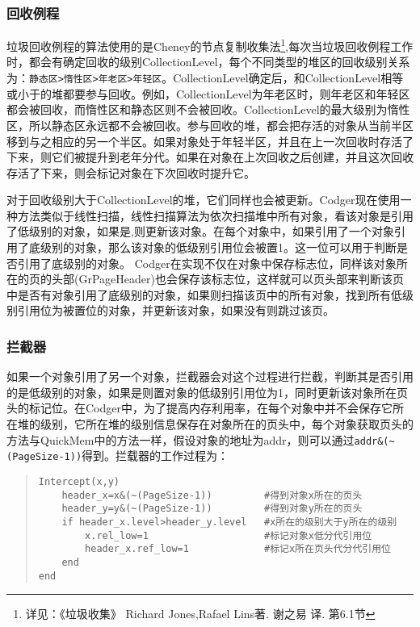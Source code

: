 \subsubsection{回收例程}
垃圾回收例程的算法使用的是Cheney的节点复制收集法\footnote{详见：《垃圾收集》 Richard Jones,Rafael Lins著. 谢之易 译. 第6.1节},每次当垃圾回收例程工作时，都会有确定回收的级别CollectionLevel，每个不同类型的堆区的回收级别关系为：\verb|静态区>惰性区>年老区>年轻区|。CollectionLevel确定后，和CollectionLevel相等或小于的堆都要参与回收。例如，CollectionLevel为年老区时，则年老区和年轻区都会被回收，而惰性区和静态区则不会被回收。CollectionLevel的最大级别为惰性区，所以静态区永远都不会被回收。参与回收的堆，都会把存活的对象从当前半区移到与之相应的另一个半区。如果对象处于年轻半区，并且在上一次回收时存活了下来，则它们被提升到老年分代。如果在对象在上次回收之后创建，并且这次回收存活了下来，则会标记对象在下次回收时提升它。

对于回收级别大于CollectionLevel的堆，它们同样也会被更新。Codger现在使用一种方法类似于线性扫描，线性扫描算法为依次扫描堆中所有对象，看该对象是引用了低级别的对象，如果是,则更新该对象。在每个对象中，如果引用了一个对象引用了底级别的对象，那么该对象的低级别引用位会被置1。这一位可以用于判断是否引用了底级别的对象。
Codger在实现不仅在对象中保存标志位，同样该对象所在的页的头部(GrPageHeader)也会保存该标志位，这样就可以页头部来判断该页中是否有对象引用了底级别的对象，如果则扫描该页中的所有对象，找到所有低级别引用位为被置位的对象，并更新该对象，如果没有则跳过该页。

\subsubsection{拦截器}
如果一个对象引用了另一个对象，拦截器会对这个过程进行拦截，判断其是否引用的是低级别的对象，如果是则置对象的低级别引用位为1，同时更新该对象所在页头的标记位。在Codger中，为了提高内存利用率，在每个对象中并不会保存它所在堆的级别，它所在堆的级别信息保存在对象所在的页头中，每个对象获取页头的方法与QuickMem中的方法一样，假设对象的地址为addr，则可以通过\verb|addr&(~(PageSize-1))|得到。拦载器的工作过程为：
\begin{quote}
\begin{verbatim}
Intercept(x,y)
    header_x=x&(~(PageSize-1))         #得到对象x所在的页头
    header_y=y&(~(PageSize-1))         #得到对象y所在的页头
    if header_x.level>header_y.level   #x所在的级别大于y所在的级别
        x.rel_low=1                    #标记对象x低分代引用位
        header_x.ref_low=1             #标记x所在页头代分代引用位
    end
end
\end{verbatim}
\end{quote}

